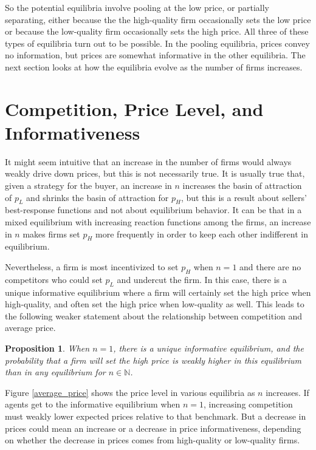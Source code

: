 \documentclass[12pt]{article}
\newtheorem{proposition}{Proposition}
\begin{document}
So the potential equilibria involve pooling at the low price, or partially separating, either because the the high-quality firm occasionally sets the low price or because the low-quality firm occasionally sets the high price. All three of these types of equilibria turn out to be possible. In the pooling equilibria, prices convey no information, but prices are somewhat informative in the other equilibria. The next section looks at how the equilibria evolve as the number of firms increases.




\section{Competition, Price Level, and Informativeness}

It might seem intuitive that an increase in the number of firms would always weakly drive down prices, but this is not necessarily true. It is usually true that, given a strategy for the buyer, an increase in $n$ increases the basin of attraction of $p_L$ and shrinks the basin of attraction for $p_H$, but this is a result about sellers' best-response functions and not about equilibrium behavior. It can be that in a mixed equilibrium with increasing reaction functions among the firms, an increase in $n$ makes firms set $p_H$ more frequently in order to keep each other indifferent in equilibrium.

Nevertheless, a firm is most incentivized to set $p_H$ when $n=1$ and there are no competitors who could set $p_L$ and undercut the firm. In this case, there is a unique informative equilibrium where a firm will certainly set the high price when high-quality, and often set the high price when low-quality as well. This leads to the following weaker statement about the relationship between competition and average price.

\begin{proposition}
When $n=1$, there is a unique informative equilibrium, and the probability that a firm will set the high price is weakly higher in this equilibrium than in any equilibrium for $n \in \mathbb{N}$.
\end{proposition}

Figure \ref{average_price} shows the price level in various equilibria as $n$ increases. If agents get to the informative equilibrium when $n=1$, increasing competition must weakly lower expected prices relative to that benchmark. But a decrease in prices could mean an increase or a decrease in price informativeness, depending on whether the decrease in prices comes from high-quality or low-quality firms. 
\end{document}
